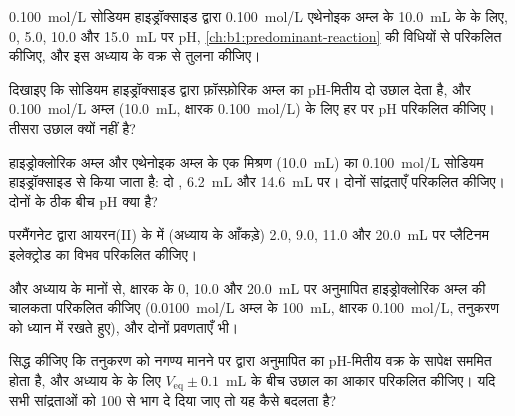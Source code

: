 \begin{exercise}[$\star\star$]\label{exo:b1:titration-methods:5}
\qty{0.100}{mol/L} सोडियम हाइड्रॉक्साइड द्वारा \qty{0.100}{mol/L}
एथेनोइक अम्ल के \qty{10.0}{mL} के  के लिए, 0, 5.0, 10.0
और \qty{15.0}{mL} पर pH, \cref{ch:b1:predominant-reaction} की विधियों से परिकलित कीजिए,
और इस अध्याय के वक्र से तुलना कीजिए।
\end{exercise}

\begin{exercise}[$\star\star$]\label{exo:b1:titration-methods:6}
दिखाइए कि सोडियम हाइड्रॉक्साइड द्वारा फ़ॉस्फ़ोरिक अम्ल का pH-मितीय 
दो उछाल देता है, और \qty{0.100}{mol/L} अम्ल (\qty{10.0}{mL}, क्षारक \qty{0.100}{mol/L})
के लिए हर  पर pH परिकलित कीजिए। तीसरा उछाल
क्यों नहीं है?
\end{exercise}

\begin{exercise}[$\star\star$]\label{exo:b1:titration-methods:7}
हाइड्रोक्लोरिक अम्ल और एथेनोइक अम्ल के एक मिश्रण (\qty{10.0}{mL}) का
\qty{0.100}{mol/L} सोडियम हाइड्रॉक्साइड से  किया जाता है: दो ,
\qty{6.2}{mL} और \qty{14.6}{mL} पर। दोनों सांद्रताएँ परिकलित कीजिए। दोनों 
के ठीक बीच pH क्या है?
\end{exercise}

\begin{exercise}[$\star\star$]\label{exo:b1:titration-methods:8}
परमैंगनेट द्वारा आयरन(II) के  में (अध्याय के आँकड़े) 2.0, 9.0, 11.0 और
\qty{20.0}{mL} पर प्लैटिनम इलेक्ट्रोड का विभव परिकलित कीजिए।
\end{exercise}

\begin{exercise}[$\star\star$]\label{exo:b1:titration-methods:9}
 और अध्याय के मानों से, क्षारक के 0, 10.0 और
\qty{20.0}{mL} पर अनुमापित हाइड्रोक्लोरिक अम्ल की चालकता परिकलित कीजिए
(\qty{0.0100}{mol/L} अम्ल के \qty{100}{mL}, क्षारक
\qty{0.100}{mol/L}, तनुकरण को ध्यान में रखते हुए), और दोनों प्रवणताएँ भी।
\end{exercise}

\begin{exercise}[$\star\star\star$]\label{exo:b1:titration-methods:10}
सिद्ध कीजिए कि तनुकरण को नगण्य मानने पर  द्वारा अनुमापित  का
pH-मितीय वक्र  के सापेक्ष सममित होता है,
और अध्याय के  के लिए $V_{\mathrm{eq}} \pm 0.1$~mL के बीच उछाल का
आकार परिकलित कीजिए। यदि सभी
सांद्रताओं को 100 से भाग दे दिया जाए तो यह कैसे बदलता है?
\end{exercise}

